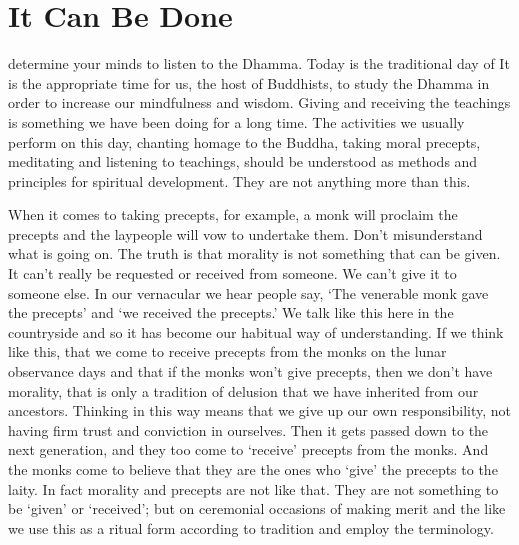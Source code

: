 
\chapter{It Can Be Done}

 determine your minds to listen to the Dhamma. Today is the traditional day of  It is the appropriate time for us, the host of Buddhists, to study the Dhamma in order to increase our mindfulness and wisdom. Giving and receiving the teachings is something we have been doing for a long time. The activities we usually perform on this day, chanting homage to the Buddha, taking moral precepts, meditating and listening to teachings, should be understood as methods and principles for spiritual development. They are not anything more than this.

When it comes to taking precepts, for example, a monk will proclaim the precepts and the laypeople will vow to undertake them. Don't misunderstand what is going on. The truth is that morality is not something that can be given. It can't really be requested or received from someone. We can't give it to someone else. In our vernacular we hear people say, `The venerable monk gave the precepts' and `we received the precepts.' We talk like this here in the countryside and so it has become our habitual way of understanding. If we think like this, that we come to receive precepts from the monks on the lunar observance days and that if the monks won't give precepts, then we don't have morality, that is only a tradition of delusion that we have inherited from our ancestors. Thinking in this way means that we give up our own responsibility, not having firm trust and conviction in ourselves. Then it gets passed down to the next generation, and they too come to `receive' precepts from the monks. And the monks come to believe that they are the ones who `give' the precepts to the laity. In fact morality and precepts are not like that. They are not something to be `given' or `received'; but on ceremonial occasions of making merit and the like we use this as a ritual form according to tradition and employ the terminology.

